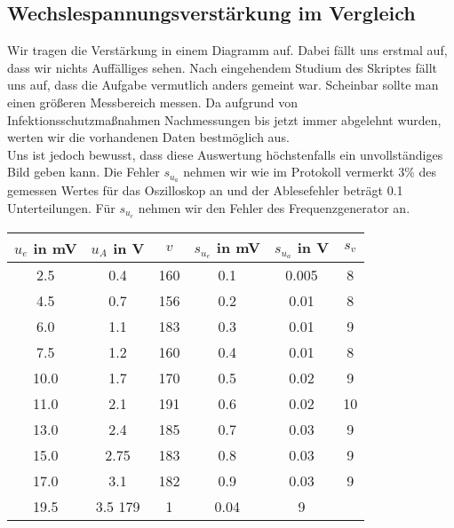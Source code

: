 \subsection{Wechslespannungsverstärkung im Vergleich}

Wir tragen die Verstärkung in einem Diagramm auf. Dabei fällt uns erstmal auf, dass wir nichts Auffälliges sehen. Nach eingehendem Studium des Skriptes fällt uns auf, dass 
die Aufgabe vermutlich anders gemeint war. Scheinbar sollte man einen größeren Messbereich messen. Da aufgrund von Infektionsschutzmaßnahmen Nachmessungen bis jetzt immer 
abgelehnt wurden, werten wir die vorhandenen Daten bestmöglich aus.\\
Uns ist jedoch bewusst, dass diese Auswertung höchstenfalls ein unvollständiges Bild geben kann. Die Fehler $s_{u_a}$
nehmen wir wie im Protokoll vermerkt 3\% des gemessen Wertes für das Oszilloskop an und der Ablesefehler beträgt 0.1 Unterteilungen. Für $s_{u_e}$ nehmen wir den Fehler des Frequenzgenerator an.
\newpage


\begin{table}[h]
    \centering
    \begin{tabular}[h]{c|c|c|c|c|c}


        $u_e$ in mV & $u_A$ in V & $v$ & $s_{u_e}$ in mV&  $s_{u_a}$ in V & $s_v$ \\
       \hline
        2.5 & 0.4 & 160 & 0.1 & 0.005 & 8 \\
        4.5 & 0.7 & 156 & 0.2 & 0.01 & 8\\
        6.0 & 1.1 & 183 & 0.3 & 0.01 & 9\\
        7.5 & 1.2 & 160 & 0.4 & 0.01 & 8\\
        10.0 & 1.7 & 170 & 0.5 & 0.02 & 9\\
        11.0 & 2.1 & 191 & 0.6 & 0.02 & 10\\
        13.0 & 2.4 & 185 & 0.7 & 0.03 & 9\\
        15.0 & 2.75 & 183 & 0.8 & 0.03 & 9\\
        17.0 & 3.1 & 182 & 0.9 & 0.03 & 9\\
        19.5 & 3.5 179 & 1 & 0.04 & 9\\

    \end{tabular}
\end{table}
